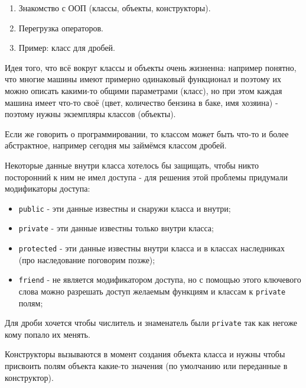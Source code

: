 \label{md2tex1}
\hyperref[md2texREADME]{\color{cyan}{К главному описанию}}


\begin{enumerate}
    \item Знакомство с ООП (классы, объекты, конструкторы).
    \item Перегрузка операторов.
    \item Пример: класс для дробей.
\end{enumerate}


Идея того, что всё вокруг классы и объекты очень жизненна: например понятно, что многие машины имеют примерно одинаковый функционал и поэтому их можно описать какими-то общими параметрами (класс), но при этом каждая машина имеет что-то своё (цвет, количество бензина в баке, имя хозяина) - поэтому нужны экземпляры классов (объекты).

Если же говорить о программировании, то классом может быть что-то и более абстрактное, например сегодня мы займёмся классом дробей.


Некоторые данные внутри класса хотелось бы защищать, чтобы никто посторонний к ним не имел доступа - для решения этой проблемы придумали модификаторы доступа:
\begin{itemize}
    \item \texttt{public} - эти данные известны и снаружи класса и внутри;
    \item \texttt{private} - эти данные известны только внутри класса;
    \item \texttt{protected} - эти данные известны внутри класса и в классах наследниках (про наследование поговорим позже);
    \item \texttt{friend} - не является модификатором доступа, но с помощью этого ключевого слова можно разрешать доступ желаемым функциям и классам к \texttt{private} полям;
\end{itemize}

Для дроби хочется чтобы числитель и знаменатель были \texttt{private} так как негоже кому попало их менять.


Конструкторы вызываются в момент создания объекта класса и нужны чтобы присвоить полям объекта какие-то значения (по умолчанию или переданные в конструктор).


